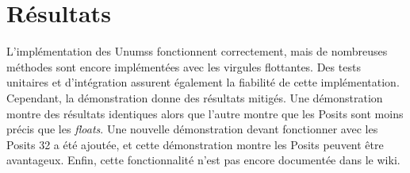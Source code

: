 \section{Résultats}

L'implémentation des \glspl{Unums} fonctionnent correctement, mais de nombreuses méthodes sont encore implémentées avec les virgules flottantes. Des tests unitaires et d'intégration assurent également la fiabilité de cette implémentation. Cependant, la démonstration donne des résultats mitigés. Une démonstration montre des résultats identiques alors que l'autre montre que les \glspl{Posit} sont moins précis que les \textit{floats}. Une nouvelle démonstration devant fonctionner avec les \glspl{Posit} 32 a été ajoutée, et cette démonstration montre les \glspl{Posit} peuvent être avantageux. Enfin, cette fonctionnalité n'est pas encore documentée dans le wiki.